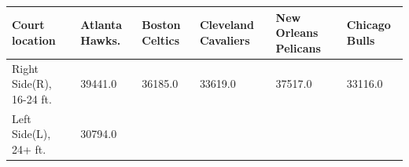 \documentclass[]{article}
\begin{document}
\begin{longtable}[]{@{}llllll@{}}
\toprule
\begin{minipage}[b]{0.24\columnwidth}\raggedright\strut
Court location\strut
\end{minipage} & \begin{minipage}[b]{0.12\columnwidth}\raggedright\strut
Atlanta Hawks.\strut
\end{minipage} & \begin{minipage}[b]{0.12\columnwidth}\raggedright\strut
Boston Celtics\strut
\end{minipage} & \begin{minipage}[b]{0.10\columnwidth}\raggedright\strut
Cleveland Cavaliers\strut
\end{minipage} & \begin{minipage}[b]{0.12\columnwidth}\raggedright\strut
New Orleans Pelicans\strut
\end{minipage} & \begin{minipage}[b]{0.12\columnwidth}\raggedright\strut
Chicago Bulls\strut
\end{minipage}\tabularnewline
\midrule
\endhead
\begin{minipage}[t]{0.24\columnwidth}\raggedright\strut
Right Side(R), 16-24 ft.\strut
\end{minipage} & \begin{minipage}[t]{0.12\columnwidth}\raggedright\strut
39441.0\strut
\end{minipage} & \begin{minipage}[t]{0.12\columnwidth}\raggedright\strut
36185.0\strut
\end{minipage} & \begin{minipage}[t]{0.10\columnwidth}\raggedright\strut
33619.0\strut
\end{minipage} & \begin{minipage}[t]{0.12\columnwidth}\raggedright\strut
37517.0\strut
\end{minipage} & \begin{minipage}[t]{0.12\columnwidth}\raggedright\strut
33116.0\strut
\end{minipage}\tabularnewline
\begin{minipage}[t]{0.24\columnwidth}\raggedright\strut
Left Side(L), 24+ ft.\strut
\end{minipage} & \begin{minipage}[t]{0.12\columnwidth}\raggedright\strut
30794.0\strut
\end{minipage} & \begin{minipage}[t]{0.12\columnwidth}\raggedright\strut

\end{minipage}
\end{longtable}
\end{document}
